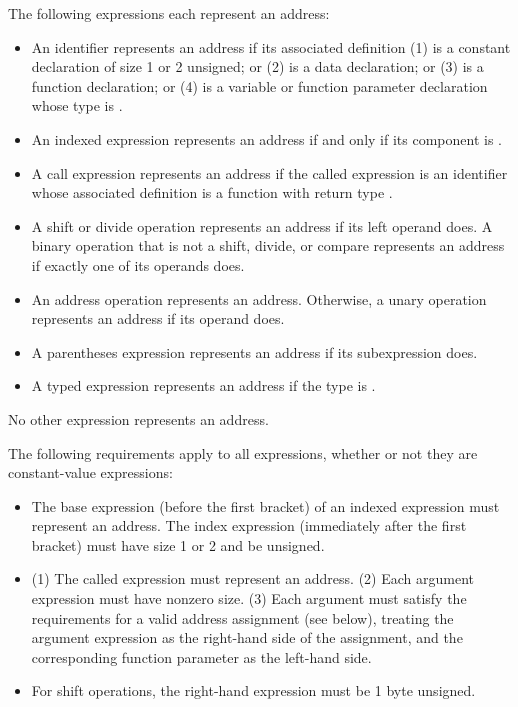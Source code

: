 \documentclass[10pt]{article}
\begin{document}
 The following expressions each represent
an address:
%
\begin{itemize}
%
\item {} An identifier represents an address if its
  associated definition (1) is a constant declaration of size 1 or 2
  unsigned; or (2) is a data declaration; or (3) is a function
  declaration; or (4) is a variable or function parameter declaration
  whose type is .
%
\item {} An indexed expression represents
  an address if and only if its  component is
  .
%
\item {}  A call expression represents an
  address if the called expression is an identifier whose associated
  definition is a function with return type .
%
\item {} A shift or divide operation
  represents an address if its left operand does.  A binary operation
  that is not a shift, divide, or compare represents an address if
  exactly one of its operands does.
%
\item {} An address operation
   represents an address.  Otherwise, a unary operation
  represents an address if its operand does.
%
\item {} A parentheses expression
  represents an address if its subexpression does.
%
\item {} A typed expression represents an
  address if the type is .
%
\end{itemize}
%
No other expression represents an address.

The following requirements apply to all expressions, whether or not
they are constant-value expressions:
%
\begin{itemize}
%
\item {} The base expression (before the
  first bracket) of an indexed expression must represent an address.
  The index expression (immediately after the first bracket) must have
  size 1 or 2 and be unsigned.
%
\item {} (1) The called expression must
  represent an address.  (2) Each argument expression must have
  nonzero size. (3) Each argument must satisfy the requirements for a
  valid address assignment (see below), treating the argument
  expression as the right-hand side of the assignment, and the
  corresponding function parameter as the left-hand side.
%
\item {}  For shift operations,
  the right-hand expression must be 1 byte unsigned.
%
\end{itemize}
\end{document}
